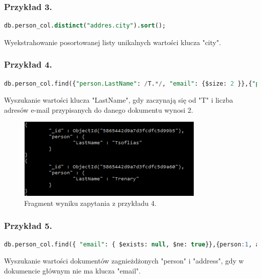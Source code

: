 \documentclass[a4paper,12pt,table]{article}
\begin{document}
{\subsubsection*{Przykład 3.}
\begin{lstlisting}[language=SQL,basicstyle=\footnotesize]
db.person_col.distinct("addres.city").sort();
\end{lstlisting}
\vspace{0.5cm}
Wyekstrahowanie posortowanej listy unikalnych wartości klucza "city".

\subsubsection*{Przykład 4.}
\begin{lstlisting}[language=SQL,basicstyle=\footnotesize]
db.person_col.find({"person.LastName": /T.*/, "email": {$size: 2 }},{"person.LastName":1}).pretty();
\end{lstlisting}
\vspace{0.5cm}
Wyszukanie wartości klucza "LastName", gdy zaczynają się od "T" i liczba adresów e-mail przypisanych do danego dokumentu wynosi 2.

\begin{figure}[h]
\begin{center}
\includegraphics[scale=0.9]{sc/52}

\end{center}
\caption{Fragment wyniku zapytania z przykładu 4.}
\end{figure}
\subsubsection*{Przykład 5.}
\begin{lstlisting}[language=SQL,basicstyle=\footnotesize]
db.person_col.find({ "email": { $exists: null, $ne: true}},{person:1, address:1 });
\end{lstlisting}
\vspace{0.5cm}
Wyszukanie wartości dokumentów zagnieżdżonych "person" i "address", gdy w dokumencie głównym nie ma klucza "email".
}
\end{document}
